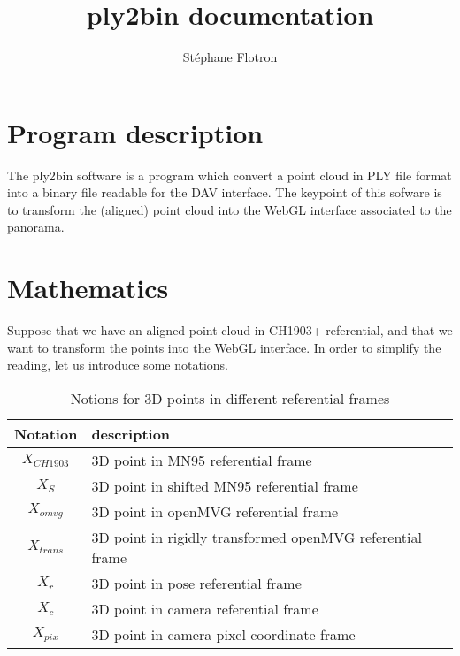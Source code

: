 \documentclass[a4paper, 11pt]{article}
\author{ St\'ephane Flotron }
\title{\textbf{ply2bin documentation}}
\begin{document}
   \maketitle
   
   \section*{Program description}
   
   The ply2bin software is a program which convert a point cloud in PLY file format into 
   a binary file readable for the DAV interface. 
   The keypoint of this sofware is to transform the (aligned) point cloud into the WebGL
   interface associated to the panorama.
   
   \section*{Mathematics}
   
   Suppose that we have an aligned point cloud in CH1903+ referential, and that we want to transform the points into
   the WebGL interface. In order to simplify the reading, let us introduce some notations. 
   
   \begin{table}[H]
      \begin{center}
        \begin{tabular}{|c|l|}
                \hline 
                    Notation & description \\
                \hline
                    $X_{CH1903}$ & 3D point in MN95 referential frame \\
                    $X_S$       & 3D point in shifted MN95 referential frame \\
                    $X_{omvg}$   & 3D point in openMVG referential frame \\
                    $X_{trans}$ & 3D point in rigidly transformed openMVG referential frame \\
                    $X_r$       & 3D point in pose referential frame \\
                    $X_c$       & 3D point in camera referential frame \\
                    $X_{pix}$   & 3D point in camera pixel coordinate frame \\
                \hline
        \end{tabular}
      \end{center}
      \label{3D point notation}
      \caption{Notions for 3D points in different referential frames}
   \end{table}
   
\end{document}
